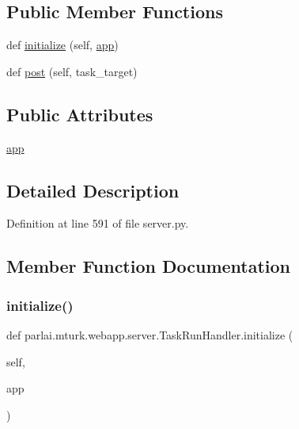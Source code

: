 \subsection*{Public Member Functions}
\begin{DoxyCompactItemize}
\item 
def \hyperlink{classparlai_1_1mturk_1_1webapp_1_1server_1_1TaskRunHandler_a110db01a938080c447a64b5a70918e25}{initialize} (self, \hyperlink{classparlai_1_1mturk_1_1webapp_1_1server_1_1TaskRunHandler_ae9e57d3ffed2fe707e9b1b041e65c2b7}{app})
\item 
def \hyperlink{classparlai_1_1mturk_1_1webapp_1_1server_1_1TaskRunHandler_a957a29eb2fcfec6fba5890470387e1d0}{post} (self, task\+\_\+target)
\end{DoxyCompactItemize}
\subsection*{Public Attributes}
\begin{DoxyCompactItemize}
\item 
\hyperlink{classparlai_1_1mturk_1_1webapp_1_1server_1_1TaskRunHandler_ae9e57d3ffed2fe707e9b1b041e65c2b7}{app}
\end{DoxyCompactItemize}


\subsection{Detailed Description}


Definition at line 591 of file server.\+py.



\subsection{Member Function Documentation}
\mbox{\label{classparlai_1_1mturk_1_1webapp_1_1server_1_1TaskRunHandler_a110db01a938080c447a64b5a70918e25}} 
\subsubsection{\texorpdfstring{initialize()}{initialize()}}
{\footnotesize\ttfamily def parlai.\+mturk.\+webapp.\+server.\+Task\+Run\+Handler.\+initialize (\begin{DoxyParamCaption}\item[{}]{self,  }\item[{}]{app }\end{DoxyParamCaption})}



